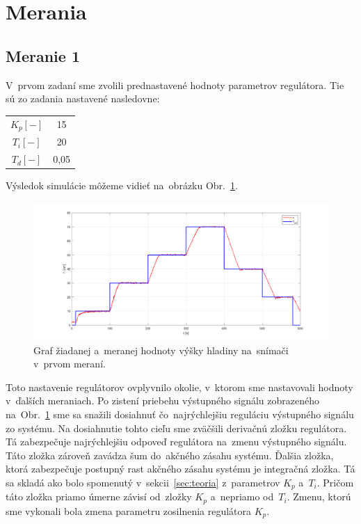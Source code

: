 \documentclass{article}
\begin{document}
\newpage

\section{Merania}
\label{sec:merania}

\subsection{Meranie 1}
\label{sec:meranie1}

V~prvom zadaní sme zvolili prednastavené hodnoty parametrov regulátora. Tie sú zo zadania nastavené nasledovne:

\begin{center}
\begin{tabular}{ |c|c| }
 \hline
 $K_p [-]$ & 15 \\
 $T_i [-]$ & 20 \\
 $T_d [-]$ & 0,05 \\
 \hline
\end{tabular}
\end{center}

Výsledok simulácie môžeme vidieť na~obrázku Obr.~\ref{fig:m1}.

\begin{figure}[!htbp]
	\begin{center}
		\includegraphics[width=\textwidth]{./include/meranie1.png}
	\end{center}
	\caption{Graf žiadanej a~meranej hodnoty výšky hladiny na~snímači v~prvom meraní.}
	\label{fig:m1}
\end{figure}


Toto nastavenie regulátorov ovplyvnilo okolie, v~ktorom sme nastavovali hodnoty v~ďalších meraniach. Po zistení
priebehu výstupného signálu zobrazeného na~Obr.~\ref{fig:m1} sme sa snažili dosiahnuť čo~najrýchlejšiu reguláciu
výstupného signálu zo systému. Na dosiahnutie tohto cieľu sme zväčšili derivačnú zložku regulátora.
Tá zabezpečuje najrýchlejšiu odpoveď regulátora na~zmenu výstupného signálu. Táto zložka zároveň zavádza šum
do~akčného zásahu systému. Ďalšia zložka, ktorá zabezpečuje postupný rast akčného zásahu systému je integračná
zložka. Tá sa skladá ako bolo spomenutý v~sekcii~\ref{sec:teoria} z~parametrov $K_p$ a~$T_i$. Pričom táto zložka
priamo úmerne závisí od~zložky $K_p$ a~nepriamo od~$T_i$. Zmenu, ktorú sme vykonali bola zmena parametru
zosilnenia regulátora $K_p$.
\end{document}

